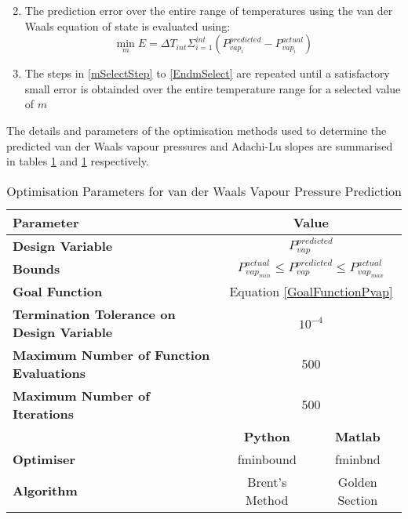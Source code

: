 \begin{enumerate}
\begin{enumerate}
\begin{equation}
							\end{equation}
				\end{enumerate}
				\item The prediction error over the entire range of temperatures using the van der Waals equation of state is evaluated using: \label{EndmSelect}
					\begin{equation}
						\min_{m} E = \Delta T_{int}\Sigma_{i =1}^{int} \left(P_{vap_{i}}^{predicted} - P_{vap_{i}}^{actual}\right) \label{GoalFunctionm}
					\end{equation}
				\item The steps in \ref{mSelectStep} to \ref{EndmSelect} are repeated until a satisfactory small error is obtainded over the entire temperature range for a selected value of $m$				
			\end{enumerate}
			
			The details and parameters of the optimisation methods used to determine the predicted van der Waals vapour pressures and Adachi-Lu slopes are summarised in tables \ref{PvapOptParam} and \ref{PvapOptParam} respectively.
			\begin{table}
			\begin{tabular*}{\textwidth}{l|cc}
				\hline
				\textbf{Parameter}&\multicolumn{2}{c}{\textbf{Value}}\\
				\hline
				\hline
				\textbf{Design Variable}& \multicolumn{2}{c}{$P_{vap}^{predicted}$}\\
				\textbf{Bounds}& \multicolumn{2}{c}{$P_{vap_{min}}^{actual} \leq P_{vap}^{predicted} \leq P_{vap_{max}}^{actual}$}\\
				\textbf{Goal Function}& \multicolumn{2}{c}{Equation \ref{GoalFunctionPvap}} \\
				\textbf{Termination Tolerance on Design Variable}& \multicolumn{2}{c}{$10^{-4}$}\\
				\textbf{Maximum Number of Function Evaluations}& \multicolumn{2}{c}{500}\\
				\textbf{Maximum Number of Iterations}& \multicolumn{2}{c}{500}\\				
				\cline{2-3}
				&\textbf{Python}&\textbf{Matlab}\\
				\cline{2-3}
				\textbf{Optimiser }&fminbound&fminbnd\\
				\textbf{Algorithm}& Brent's Method&Golden Section\\
				\hline
				\end{tabular*}\\
			\caption{Optimisation Parameters for van der Waals Vapour Pressure Prediction} \label{PvapOptParam}
			\end{table}
			
